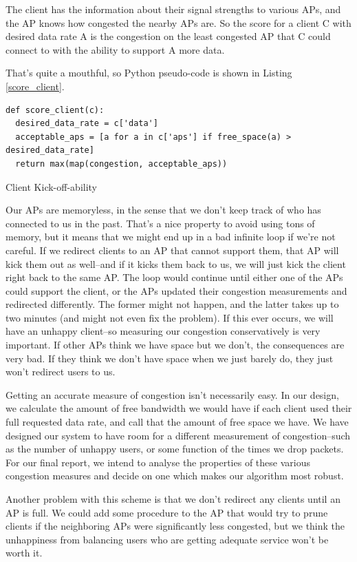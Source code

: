 \documentclass[journal]{IEEEtran}
\begin{document}
The client has the information about their signal strengths to various APs, and
the AP knows how congested the nearby APs are. So the score for a client C with
desired data rate A is the congestion on the least congested AP that C could
connect to with the ability to support A more data.

That's quite a mouthful, so Python pseudo-code is shown in Listing \ref{score_client}.
\begin{listing}[H]
\begin{verbatim}
def score_client(c):
  desired_data_rate = c['data']
  acceptable_aps = [a for a in c['aps'] if free_space(a) > desired_data_rate]
  return max(map(congestion, acceptable_aps))
\end{verbatim}
\caption{Client Kick-off-ability}
\label{score_client}
\end{listing}

Our APs are memoryless, in the sense that we don't keep track of who has
connected to us in the past. That's a nice property to avoid using tons of
memory, but it means that we might end up in a bad infinite loop if we're not
careful. If we redirect clients to an AP that cannot support them, that AP will
kick them out as well--and if it kicks them back to us, we will just kick the
client right back to the same AP. The loop would continue until either one of
the APs could support the client, or the APs updated their congestion
measurements and redirected differently. The former might not happen, and the
latter takes up to two minutes (and might not even fix the problem). If this
ever occurs, we will have an unhappy client--so measuring our congestion
conservatively is very important. If other APs think we have space but we
don't, the consequences are very bad. If they think we don't have space when we
just barely do, they just won't redirect users to us.

Getting an accurate measure of congestion isn't necessarily easy. In our
design, we calculate the amount of free bandwidth we would have if each client
used their full requested data rate, and call that the amount of free space we
have. We have designed our system to have room for a different measurement of
congestion--such as the number of unhappy users, or some function of the times
we drop packets. For our final report, we intend to analyse the properties of
these various congestion measures and decide on one which makes our algorithm
most robust.

Another problem with this scheme is that we don't redirect any clients until
an AP is full.
We could add some procedure to the AP that would try to prune clients if the
neighboring APs were significantly less congested, but we think the unhappiness
from balancing users who are getting adequate service won't be worth it.
\end{document}
